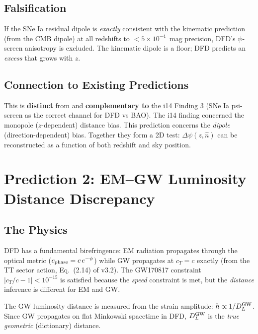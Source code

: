 \documentclass[11pt]{article}
\begin{document}
\subsection{Falsification}

If the SNe Ia residual dipole is \emph{exactly} consistent with
the kinematic prediction (from the CMB dipole) at all redshifts to
$< 5 \times 10^{-4}$~mag precision, DFD's $\psi$-screen anisotropy
is excluded.  The kinematic dipole is a floor; DFD predicts an
\emph{excess} that grows with $z$.

\subsection{Connection to Existing Predictions}

This is \textbf{distinct} from and \textbf{complementary to} the i14
Finding 3 (SNe Ia psi-screen as the correct channel for DFD vs BAO).
The i14 finding concerned the monopole ($z$-dependent) distance bias.
This prediction concerns the \emph{dipole} (direction-dependent) bias.
Together they form a 2D test: $\Delta\psi(z,\hat{n})$ can be
reconstructed as a function of both redshift and sky position.

\section{Prediction 2: EM--GW Luminosity Distance Discrepancy}
\label{sec:em-gw}

\subsection{The Physics}

DFD has a fundamental birefringence: EM radiation propagates through the
optical metric ($c_{\rm phase} = c\,e^{-\psi}$) while GW propagates at
$c_T = c$ exactly (from the TT sector action, Eq.~(2.14) of v3.2).
The GW170817 constraint $|c_T/c - 1| < 10^{-15}$ is satisfied because
the \emph{speed} constraint is met, but the \emph{distance} inference
is different for EM and GW.

The GW luminosity distance is measured from the strain amplitude:
$h \propto 1/D_L^{\rm GW}$.  Since GW propagates on flat Minkowski
spacetime in DFD, $D_L^{\rm GW}$ is the \emph{true geometric}
(dictionary) distance.
\end{document}
